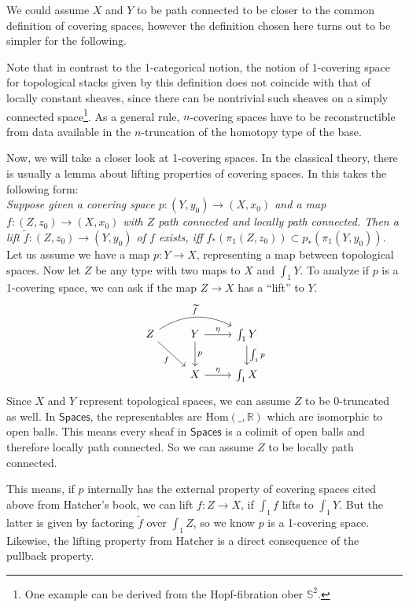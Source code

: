 \documentclass[9pt,twosided]{amsart}
\newcommand{\shape}{\int}
\newcommand{\bR}{\mathbb R}
\newcommand{\bS}{\mathbb S}
\newcommand{\Spaces}{\ensuremath{\mathsf{Spaces}}}
\begin{document}
We could assume $X$ and $Y$ to be path connected to be closer to the common definition of covering spaces,
however the definition chosen here turns out to be simpler for the following.

Note that in contrast to the 1-categorical notion, the notion of 1-covering space for topological stacks given by this definition does not coincide with that of locally constant sheaves, since there can be nontrivial such sheaves on a simply connected space\footnote{One example can be derived from the Hopf-fibration ober $\bS^2$.}.
As a general rule, $n$-covering spaces have to be reconstructible from data available in the $n$-truncation of the homotopy type of the base. 

Now, we will take a closer look at 1-covering spaces.
In the classical theory, there is usually a lemma about lifting properties of covering spaces.
In \cite[Proposition 1.33, p. 61]{Hatcher} this takes the following form: \\
\emph{Suppose given a covering space $p:({Y},{y}_0)\to (X,x_0)$ and a map $f:(Z,z_0)\to (X,x_0)$
  with $Z$ path connected and locally path connected.
  Then a lift $\widetilde{f}:(Z,z_0)\to(Y,{y}_0)$ of $f$ exists, iff $f_\ast(\pi_1(Z,z_0))\subset p_\ast(\pi_1({Y},{y}_0))$.} \\
Let us assume we have a map $p:Y\to X$, representing a map between topological spaces.
Now let $Z$ be any type with two maps to $X$ and $\shape_1 Y$.
To analyze if $p$ is a 1-covering space, we can ask if the map $Z\to X$ has a ``lift'' to $Y$.
\begin{equation*}
\begin{tikzcd}
Z\arrow[dr, swap, "f"]\arrow[rr, bend left=30, "\widetilde{f}"]  & Y\arrow[r, "\modalunit"]\arrow[d, "p"] & \shape_1 Y\arrow[d, "\shape_1 p"] \\
& X\arrow[r, "\modalunit"]  & \shape_1 X 
\end{tikzcd}
\end{equation*}
Since $X$ and $Y$ represent topological spaces, we can assume $Z$ to be 0-truncated as well.
In $\Spaces$, the representables are $\mathrm{Hom}(\_,\bR)$ which are isomorphic to open balls.
This means every sheaf in $\Spaces$ is a colimit of open balls and therefore locally path connected. 
So we can assume $Z$ to be locally path connected.

This means, if $p$ internally has the external property of covering spaces cited above from Hatcher's book, we can lift $f:Z\to X$, if $\shape_1 f$ lifts to $\shape_1 Y$.
But the latter is given by factoring $\widetilde{f}$ over $\shape_1 Z$, so we know $p$ is a 1-covering space.
Likewise, the lifting property from Hatcher is a direct consequence of the pullback property. 
\end{document}
